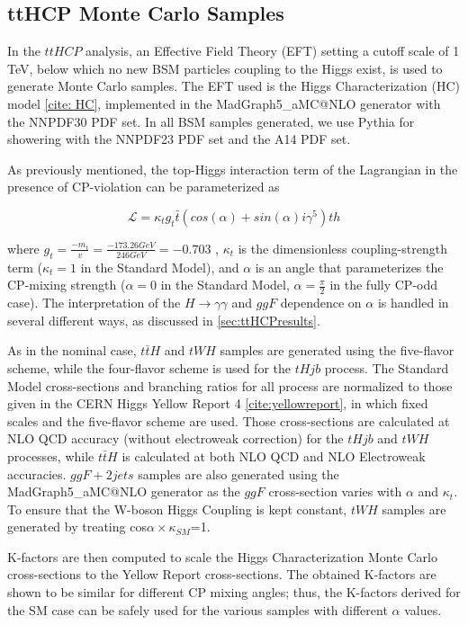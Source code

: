 \subsection{ttHCP Monte Carlo Samples} \label{sec:ttHCPMC} 

In the $ttH CP$ analysis, an Effective Field Theory (EFT) setting a cutoff scale of 1 TeV, below which no new BSM particles coupling to the Higgs exist, is used to generate Monte Carlo samples. The EFT used is the Higgs Characterization (HC) model \ref{cite: HC}, implemented in the MadGraph5\_aMC@NLO generator with the NNPDF30 PDF set. In all BSM samples generated, we use Pythia for showering with the NNPDF23 PDF set and the A14 PDF set.

As previously mentioned, the top-Higgs interaction term of the Lagrangian in the presence of CP-violation can be parameterized as

\begin{equation}
\mathcal{L} = \kappa_{t} g_{t} \bar{t} (cos(\alpha)+ sin(\alpha) i \gamma^{5} )th
\end{equation}

where $g_{t} = \frac{-m_{t}}{v} = \frac{-173.26 GeV}{246 GeV} = -0.703$ , $\kappa_{t}$ is the dimensionless coupling-strength term ($\kappa_{t}= 1$ in the Standard Model), and $\alpha$ is an angle that parameterizes the CP-mixing strength ($\alpha = 0$ in the Standard Model, $\alpha = \frac{\pi}{2}$ in the fully CP-odd case). The interpretation of the $H \rightarrow \gamma \gamma$ and $ggF$ dependence on $\alpha$ is handled in several different ways, as discussed in \ref{sec:ttHCPresults}.

As in the nominal case, $t\bar{t}H$ and $tWH$ samples are generated using the five-flavor scheme, while the four-flavor scheme is used for the $tHjb$ process. The Standard Model cross-sections and branching ratios for all process are normalized to those given in the CERN Higgs Yellow Report 4 \ref{cite:yellowreport}, in which fixed scales and the five-flavor scheme are used. Those cross-sections are calculated at NLO QCD accuracy (without electroweak correction) for the $tHjb$ and $tWH$ processes, while $t\bar{t}H$ is calculated at both NLO QCD and NLO Electroweak accuracies. $ggF+ 2 jets$ samples are also generated using the MadGraph5\_aMC@NLO generator as the $ggF$ cross-section varies with $\alpha$ and $\kappa_{t}$. To ensure that the W-boson Higgs Coupling is kept constant, $tWH$ samples are generated by treating cos$\alpha \times \kappa_{SM}$=1.


K-factors are then computed to scale the Higgs Characterization Monte Carlo cross-sections to the Yellow Report cross-sections. The obtained K-factors are shown to be similar for different CP mixing angles; thus, the K-factors derived for the SM case can be safely used for the various samples with different $\alpha$ values. 

